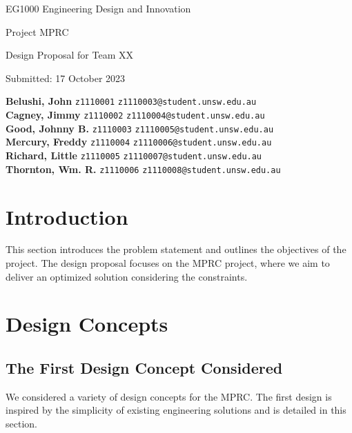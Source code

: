 \documentclass[12pt]{article}
\begin{document}
\begin{titlepage}
    \centering
    \vspace*{4cm}
    {\Large EG1000 Engineering Design and Innovation \par}
    \vspace{1.5cm}
    {\Huge Project MPRC \par}
    \vspace{1cm}
    {\Large Design Proposal for Team XX \par}
    \vfill
    {\large Submitted: 17 October 2023 \par}
    \vspace{2cm}
    \begin{tabbing}
        \textbf{Belushi, John} \hspace{1cm} \= \texttt{z1110001} \hspace{1cm} \= \texttt{z1110003@student.unsw.edu.au} \\
        \textbf{Cagney, Jimmy} \> \texttt{z1110002} \> \texttt{z1110004@student.unsw.edu.au} \\
        \textbf{Good, Johnny B.} \> \texttt{z1110003} \> \texttt{z1110005@student.unsw.edu.au} \\
        \textbf{Mercury, Freddy} \> \texttt{z1110004} \> \texttt{z1110006@student.unsw.edu.au} \\
        \textbf{Richard, Little} \> \texttt{z1110005} \> \texttt{z1110007@student.unsw.edu.au} \\
        \textbf{Thornton, Wm. R.} \> \texttt{z1110006} \> \texttt{z1110008@student.unsw.edu.au} \\
    \end{tabbing}
    \vfill
\end{titlepage}

\newpage

\tableofcontents
\newpage

\section{Introduction}
This section introduces the problem statement and outlines the objectives of the project. The design proposal focuses on the MPRC project, where we aim to deliver an optimized solution considering the constraints.

\section{Design Concepts}
\subsection{The First Design Concept Considered}
We considered a variety of design concepts for the MPRC. The first design is inspired by the simplicity of existing engineering solutions and is detailed in this section.
\end{document}
